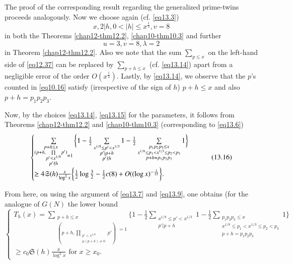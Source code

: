 The proof of the corresponding result regarding the generalized\break
prime-twins proceeds analogously. Now  we choose again
(cf. \eqref{eq13.3})  
\begin{equation*}
x, 2 |h, 0 < |h| \le x^{\frac{1}{3}}, v=8\tag{13.14}\label{eq13.14}
\end{equation*}
in both the Theorems \ref{chap12-thm12.2}, \ref{chap10-thm10.3} and
further 
\begin{equation*}
u=3,v=8, \lambda = 2\tag{13.15}\label{eq13.15}
\end{equation*}
in Theorem \ref{chap12-thm12.2}. Also we note that the sum
$\sum\limits_{p \le x}$ on the left-hand side of \eqref{eq12.37} can
be replaced by $\sum\limits_{p+h \le x}$ (cf. \eqref{eq13.14}) apart
from  a negligible error of the order
$O(x^{\frac{1}{3}})$. Lastly, by \eqref{eq13.14}, we observe
that the $p$'s counted in \eqref{eq10.16} satisfy (irrespective of the
sign of $h$) $p+h \le x$ and also $p+h=p_1 p_2 p_3$. 

Now, by the choices \eqref{eq13.14}, \eqref{eq13.15} for the
parameters, it follows from Theorems \ref{chap12-thm12.2} and
\ref{chap10-thm10.3} (corresponding to \eqref{eq13.6})   
\begin{equation*}
\begin{cases}
\sum\limits_{\substack{p+h \le x \\(p+h,{\prod\limits_{\substack{p' <
          x^{1/8}\\p' \nmid  h}}} p')}=1} \bigg\{ 1 -
\frac{1}{2} \sum\limits_{\substack{x^{1/8} \le p' <x^{1/3}\\p'
    |p+h\\p'\not\mid h}} 1- \frac{1}{2} \sum\limits_{\substack{p_1 p_2
    p_3 \le x\\x^{1/8}\le p_1 < x^{1/3} \le p_2 < p_3 \\ p+h = p_1
    p_2p_3 }} 1 \bigg\} \\  
 \ge 4 \mathfrak{S}(h) \frac{x}{\log^2 x} \bigg\{ \frac{1}{2} \log
 \frac{3}{2}- \frac{1}{2}c(8) +O(( \log
 x)^{-\frac{1}{15}}\bigg\}.
\end{cases}\tag{13.16} \label{eq13.16}
\end{equation*}

From here, on using the argument of \eqref{eq13.7} and \eqref{eq13.9},
one obtains (for the analogue of $G(N)$ the lower bound 
\begin{equation*}
\begin{cases}
T_h(x) =\sum\limits_{\substack{p+h \le x
    \\(p+h,{\prod\limits_{\substack{p' < x^{1/8}\\ \mu(p+h) \neq 0}}}
    p')}=1} \bigg\{ 1 - \frac{1}{2} \sum\limits_{\substack{x^{1/8} \le
    p' <x^{1/3}\\p' |p+ h}} 1- \frac{1}{2} \sum\limits_{\substack{p_1
    p_2 p_3 \le x\\x^{1/8}\le p_1 < x^{1/3} \le p_2 < p_3 \\ p+h = p_1
    p_2p_3 }} 1 \bigg\} \\ 
\ge c_0 \mathfrak{S}(h) \frac{x}{\log^2 x} \text{ for } x \ge x_0. 
 \end{cases}\tag{13.17}\label{eq13.17}
\end{equation*}

